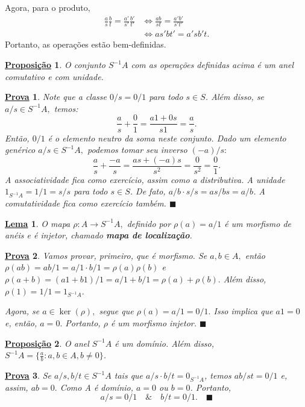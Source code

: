 \documentclass{article}
\newtheorem*{lemma*}{\underline{Lema}}
\newtheorem*{prop*}{\underline{Proposi\c c\~ao}}
\newtheorem*{proof*}{\underline{Prova}}
\renewcommand\qedsymbol{$\blacksquare$}
\begin{document}
    Agora, para o produto, 
    \begin{align*}
      \frac{a}{s}\frac{b}{t} = \frac{a'}{s'}\frac{b'}{t'} &\Longleftrightarrow \frac{ab}{st}=\frac{a'b'}{s't'}\\
                                                          &\Longleftrightarrow as'bt' = a'sb't. 
    \end{align*}
    Portanto, as operações estão bem-definidas.
    \begin{prop*}
      O conjunto \(S^{-1}A\) com as operações definidas acima é um anel comutativo e com unidade.
    \end{prop*}
    \begin{proof*}
      Note que a classe \(0/s = 0/1\) para todo \(s\in S\). Além disso, se \(a/s\in S^{-1}A,\) temos:
      \[
        \frac{a}{s}+\frac{0}{1} = \frac{a1 + 0s}{s1} = \frac{a}{s}.
      \]  
      Então, \(0/1\) é o elemento neutro da soma neste conjunto. Dado um elemento genérico \(a/s\in S^{-1}A,\) podemos tomar seu inverso \((-a)/s:\)
      \[
        \frac{a}{s}+\frac{-a}{s} = \frac{as + (-a)s}{s^{2}} = \frac{0}{s^{2}} = \frac{0}{1}.
      \]
      A associatividade fica como exercício, assim como a distributiva. A unidade \(1_{S^{-1}A} = 1/1 = s/s \) para todo \(s\in S\). De fato,
      \(a/b \cdot s/s = as/bs = a/b\). A comutatividade fica como exercício também. \qedsymbol
    \end{proof*}
    \begin{lemma*}
      O mapa \(\rho :A\rightarrow S^{-1}A,\) definido por \(\rho (a) = a/1\) é um morfismo de anéis e é injetor, chamado \textbf{mapa de localização}.
    \end{lemma*}
    \begin{proof*}
      Vamos provar, primeiro, que é morfismo. Se \(a, b\in A,\) então \(\rho (ab) = ab/1 = a/1 \cdot b/1 = \rho (a)\rho (b)\) e \(\rho (a+b) = (a1+b1)/1 = a/1 + b/1 = \rho (a) + \rho (b).\)
      Além disso, \(\rho (1) = 1/1 = 1_{S^{-1}A}.\)

      Agora, se \(a\in\ker{(\rho )},\) segue que \(\rho (a) = a/1 = 0/1.\) Isso implica que \(a1 = 0\) e, então, \(a = 0.\) Portanto,
      \(\rho \) é um morfismo injetor. \qedsymbol
    \end{proof*}
    \begin{prop*}
      O anel \(S^{-1}A\) é um domínio. Além disso, \(S^{-1}A = \biggl\{\frac{a}{b}: a, b\in A, b\neq 0\biggr\}\).  
    \end{prop*}
    \begin{proof*}
      Se \(a/s, b/t\in S^{-1}A\) tais que \(a/s \cdot b/t = 0_{S^{-1}A}\), temos \(ab/st = 0/1\) e, assim,
      \(ab = 0.\) Como A é domínio, \(a = 0\) ou \(b = 0\). Portanto,
      \[
        a/s = 0/1\quad\&\quad b/t = 0/1.\quad \text{\qedsymbol}
      \]
    \end{proof*}
    \newpage
\end{document}
